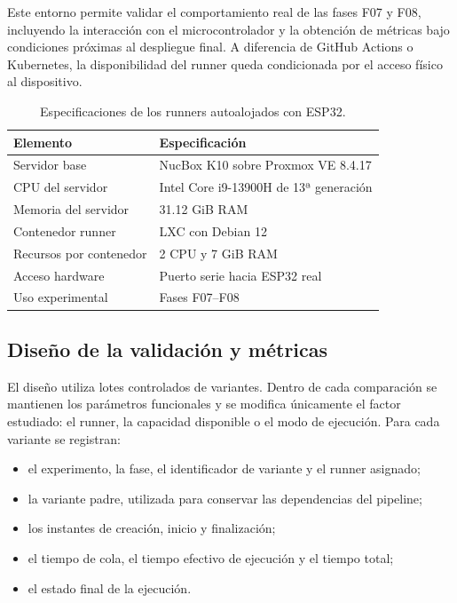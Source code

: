 Este entorno permite validar el comportamiento real de las fases F07 y F08, incluyendo la interacción con el microcontrolador y la obtención de métricas bajo condiciones próximas al despliegue final. A diferencia de GitHub Actions o Kubernetes, la disponibilidad del runner queda condicionada por el acceso físico al dispositivo.

\begin{table}[htbp]
    \centering
    \caption{Especificaciones de los runners autoalojados con ESP32.}
    \label{tab:entorno-esp32-validacion}
    \begin{tabular}{p{}p{}}
        \hline
        \textbf{Elemento} & \textbf{Especificación} \\
        \hline
        Servidor base & NucBox K10 sobre Proxmox VE 8.4.17 \\
        CPU del servidor & Intel Core i9-13900H de 13ª generación \\
        Memoria del servidor & 31.12 GiB RAM \\
        Contenedor runner & LXC con Debian 12 \\
        Recursos por contenedor & 2 CPU y 7 GiB RAM \\
        Acceso hardware & Puerto serie hacia ESP32 real \\
        Uso experimental & Fases F07--F08 \\
        \hline
    \end{tabular}
\end{table}

\subsection{Diseño de la validación y métricas}
\label{subsec:metodologia-validacion}

El diseño utiliza lotes controlados de variantes. Dentro de cada comparación se mantienen los parámetros funcionales y se modifica únicamente el factor estudiado: el runner, la capacidad disponible o el modo de ejecución. Para cada variante se registran:

\begin{itemize}
    \item el experimento, la fase, el identificador de variante y el runner asignado;
    \item la variante padre, utilizada para conservar las dependencias del pipeline;
    \item los instantes de creación, inicio y finalización;
    \item el tiempo de cola, el tiempo efectivo de ejecución y el tiempo total;
    \item el estado final de la ejecución.
\end{itemize}

